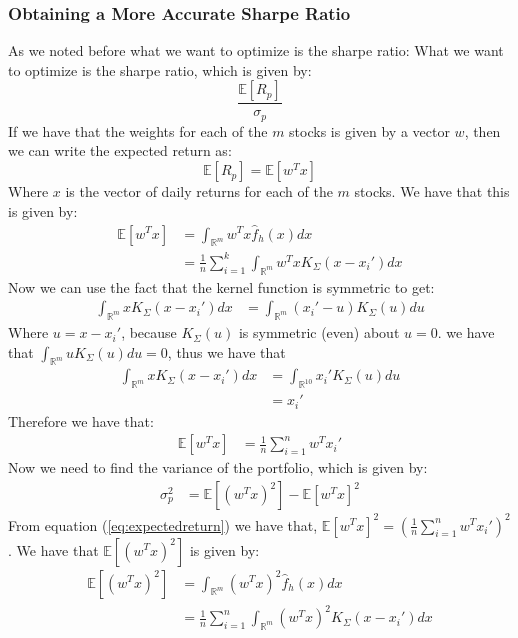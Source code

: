 \documentclass[10pt]{article}
\begin{document}
\subsubsection{Obtaining a More Accurate Sharpe Ratio}
As we noted before what we want to optimize is the sharpe ratio:
What we want to optimize is the sharpe 
ratio, which is given by: 
\begin{equation}
    \frac{\mathbb{E}[R_p]}{\sigma_p}
\end{equation}
If we have that the weights for each of the $m$ stocks is given by a vector $w$, then we can write the expected return as:
\begin{equation}
    \mathbb{E}[R_p] = \mathbb{E}[w^T x]
\end{equation}
Where $x$ is the vector of daily returns for each of the $m$ stocks. We have that this is given by:
\begin{align}
    \mathbb{E}[w^T x] &= \int_{\mathbb{R}^{m}} w^T x \hat{f}_h(x) dx \\
    &= \frac{1}{n} \sum_{i=1}^k\int_{\mathbb{R}^{m}} w^T xK_{\Sigma}(x-x_i') dx
\end{align}
Now we can use the fact that the kernel function is symmetric to get:
\begin{align*}
    \int_{\mathbb{R}^{m}} xK_{\Sigma}(x-x_i') dx & = \int_{\mathbb{R}^{m}} (x_i'-u)K_{\Sigma}(u) du 
\end{align*}
Where $u=x-x_i'$, because $K_{\Sigma}(u)$ is symmetric (even) about $u=0$. we have that $\int_{\mathbb{R}^{m}}uK_{\Sigma}(u) du = 0$, thus we have that 
\begin{align}
    \int_{\mathbb{R}^{m}} xK_{\Sigma}(x-x_i') dx & = \int_{\mathbb{R}^{10}}x_i'K_{\Sigma}(u) du \\
    &= x_i'
\end{align}
Therefore we have that:
\begin{align}
    \mathbb{E}[w^T x] &= \frac{1}{n} \sum_{i=1}^nw^T x_i'
    \label{eq:expectedreturn}
\end{align}
Now we need to find the variance of the portfolio, which is given by:
\begin{align}
    \sigma_p^2 & = \mathbb{E}[(w^T x)^2] - \mathbb{E}[w^T x]^2
    \label{eq:variance}
\end{align}
From equation (\ref{eq:expectedreturn}) we have that, $\mathbb{E}[w^T x]^2=\left(\frac{1}{n} \sum_{i=1}^nw^T x_i'\right)^2$.
We have that $\mathbb{E}[(w^T x)^2]$ is given by:
\begin{align}
    \mathbb{E}[(w^T x)^2] &= \int_{\mathbb{R}^{m}} (w^T x)^2 \hat{f}_h(x) dx \\
    &= \frac{1}{n} \sum_{i=1}^n\int_{\mathbb{R}^{m}} (w^T x)^2 K_{\Sigma}(x-x_i') dx
\end{align}
\end{document}
